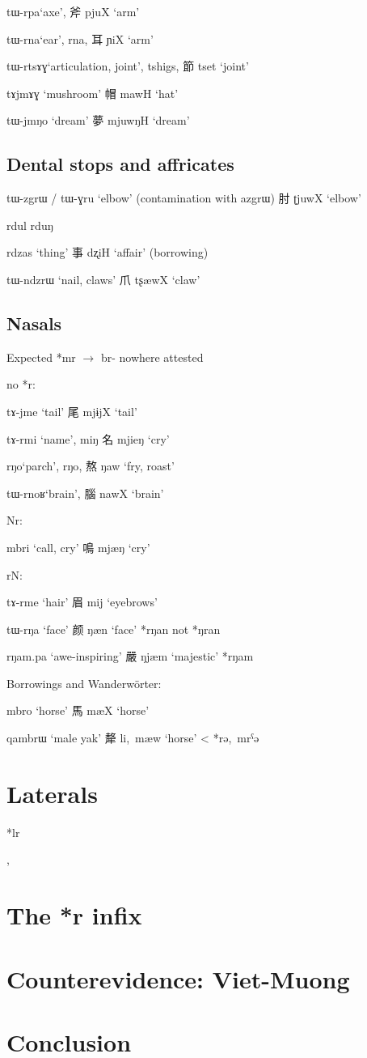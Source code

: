 \documentclass[oldfontcommands,oneside,a4paper,11pt]{article}
\newcommand{\ipa}[1]{{\phon \mbox{#1}}} %
\newcommand{\zh}[1]{{\cn #1}}
\newcommand{\ch}[3]{\zh{#1} \ipa{#2} `#3'}
\begin{document}
\ipa{tɯ-rpa}`axe', \ch{斧}{pjuX}{arm}

\ipa{tɯ-rna}`ear', \ipa{rna}, \ch{耳}{ɲiX}{arm}

\ipa{tɯ-rtsɤɣ}`articulation, joint', \ipa{tshigs}, \ch{節}{tset}{joint}

\ipa{tɤjmɤɣ} `mushroom' \ch{帽}{mawH}{hat}

\ipa{tɯ-jmŋo} `dream' \ch{夢}{mjuwŋH}{dream}

\subsection{Dental stops and affricates}
\ipa{tɯ-zgrɯ} / \ipa{tɯ-ɣru} `elbow' (contamination with \ipa{azgrɯ})  \ch{肘}{ʈjuwX}{elbow}

rdul
rduŋ

\ipa{rdzas} `thing' \ch{事}{dʐiH}{affair} (borrowing)


\ipa{tɯ-ndzrɯ} `nail, claws' \ch{爪}{tʂæwX}{claw}
\subsection{Nasals}
Expected *\ipa{mr} $\rightarrow$ \ipa{br-} nowhere attested


no *r:

\ipa{tɤ-jme} `tail' \ch{尾}{mjɨjX}{tail}

\ipa{tɤ-rmi} `name', \ipa{miŋ} \ch{名}{mjieŋ}{cry} 

\ipa{rŋo}`parch', \ipa{rŋo}, \ch{熬}{ŋaw}{fry, roast}

\ipa{tɯ-rnoʁ}`brain', \ch{腦}{nawX}{brain}

Nr:

\ipa{mbri} `call, cry' \ch{鳴}{mjæŋ}{cry}


rN:

\ipa{tɤ-rme} `hair' \ch{眉}{mij}{eyebrows}

\ipa{tɯ-rŋa} `face' \ch{颜}{ŋæn}{face} *\ipa{rŋan} not *\ipa{ŋran}

\ipa{rŋam.pa} `awe-inspiring' \ch{嚴}{ŋjæm}{majestic} *\ipa{rŋam} \citet{coblin86handlist}


Borrowings and Wanderwörter:

\ipa{mbro} `horse' \ch{馬}{mæX}{horse}

\ipa{qambrɯ} `male yak' \ch{犛}{li, mæw}{horse} < *\ipa{rə, mrˁə}


\section{Laterals}

*lr

\citet[217-225]{starostin89}, \citet[36-40]{sagart99roc}
\citet[78]{baroni14invariant}

\citet{nikitina12logophoric}

\section{The *r infix}

 \citet{sagart99roc}

\section{Counterevidence: Viet-Muong}

\section{Conclusion}




\end{document}
